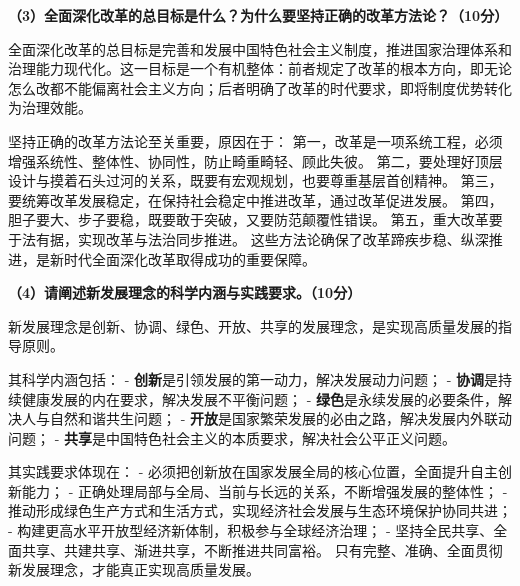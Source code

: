 \documentclass[12pt, a4paper]{article}
\begin{document}
\begin{answerbox}
\textbf{（3）全面深化改革的总目标是什么？为什么要坚持正确的改革方法论？（10分）}

全面深化改革的总目标是完善和发展中国特色社会主义制度，推进国家治理体系和治理能力现代化。这一目标是一个有机整体：前者规定了改革的根本方向，即无论怎么改都不能偏离社会主义方向；后者明确了改革的时代要求，即将制度优势转化为治理效能。  

坚持正确的改革方法论至关重要，原因在于：  
第一，改革是一项系统工程，必须增强系统性、整体性、协同性，防止畸重畸轻、顾此失彼。  
第二，要处理好顶层设计与摸着石头过河的关系，既要有宏观规划，也要尊重基层首创精神。  
第三，要统筹改革发展稳定，在保持社会稳定中推进改革，通过改革促进发展。  
第四，胆子要大、步子要稳，既要敢于突破，又要防范颠覆性错误。  
第五，重大改革要于法有据，实现改革与法治同步推进。  
这些方法论确保了改革蹄疾步稳、纵深推进，是新时代全面深化改革取得成功的重要保障。
\end{answerbox}

\begin{answerbox}
\textbf{（4）请阐述新发展理念的科学内涵与实践要求。（10分）}

新发展理念是创新、协调、绿色、开放、共享的发展理念，是实现高质量发展的指导原则。  

其科学内涵包括：  
- \textbf{创新}是引领发展的第一动力，解决发展动力问题；  
- \textbf{协调}是持续健康发展的内在要求，解决发展不平衡问题；  
- \textbf{绿色}是永续发展的必要条件，解决人与自然和谐共生问题；  
- \textbf{开放}是国家繁荣发展的必由之路，解决发展内外联动问题；  
- \textbf{共享}是中国特色社会主义的本质要求，解决社会公平正义问题。  

其实践要求体现在：  
- 必须把创新放在国家发展全局的核心位置，全面提升自主创新能力；  
- 正确处理局部与全局、当前与长远的关系，不断增强发展的整体性；  
- 推动形成绿色生产方式和生活方式，实现经济社会发展与生态环境保护协同共进；  
- 构建更高水平开放型经济新体制，积极参与全球经济治理；  
- 坚持全民共享、全面共享、共建共享、渐进共享，不断推进共同富裕。  
只有完整、准确、全面贯彻新发展理念，才能真正实现高质量发展。
\end{answerbox}
\end{document}
